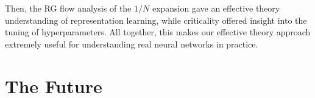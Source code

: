 \documentclass[12pt]{article}
\begin{document}
Then, the RG flow analysis of the $1/N$ expansion gave an effective theory understanding of representation learning, while criticality offered insight into the tuning of hyperparameters. All together, this makes our effective theory approach \cite{Principles} extremely useful for understanding real neural networks in practice.






































































































\section{The Future}\label{sec:future}
\end{document}
